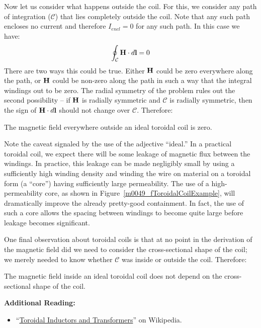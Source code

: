 Now let us consider what happens outside the coil.  For this, we consider any path of integration (${\mathcal C}$) that lies completely outside the coil.  
Note that any such path encloses no current and therefore $I_{encl}=0$ for any such path.
In this case we have:
%
\begin{equation}   
\oint_{\mathcal C}{ {\bf H} \cdot d{\bf l} } = 0 
\end{equation}
%
There are two ways this could be true.  Either ${\bf H}$ could be zero everywhere along the path, or ${\bf H}$ could be non-zero along the path in such a way that the integral windings out to be zero.  The radial symmetry of the problem rules out the second possibility -- if ${\bf H}$ is radially symmetric and ${\mathcal C}$ is radially symmetric, then the sign of ${\bf H} \cdot d{\bf l}$ should not change over ${\mathcal C}$.  Therefore:
%
\begin{mdframed}[backgroundcolor=yellow!20,nobreak=true,nobreak=true] 
The magnetic field everywhere outside an ideal toroidal coil is zero. 
\end{mdframed}
%
Note the caveat signaled by the use of the adjective ``ideal.'' In a practical toroidal coil, we expect there will be some leakage of magnetic flux between the windings.  In practice, this leakage can be made negligibly small by using a sufficiently high winding density and winding the wire on material on a toroidal form (a ``core'') having sufficiently large permeability.  
The use of a high-permeability core, as shown in Figure~\ref{m0049_fToroidalCoilExample}, will dramatically improve the already pretty-good containment.  In fact, the use of such a core allows the spacing between windings to become quite large before leakage becomes significant.

One final observation about toroidal coils is that at no point in the derivation of the magnetic field did we need to consider the cross-sectional shape of the coil; we merely needed to know whether ${\mathcal C}$ was inside or outside the coil.  Therefore:
%
\begin{mdframed}[backgroundcolor=yellow!20,nobreak=true] 
The magnetic field inside an ideal toroidal coil does not depend on the cross-sectional shape of the coil. 
\end{mdframed}


{\bf Additional Reading:}
\begin{itemize}
\item ``\href{https://en.wikipedia.org/wiki/Toroidal_inductors_and_transformers}{Toroidal Inductors and Transformers}'' on Wikipedia.
\end{itemize}



